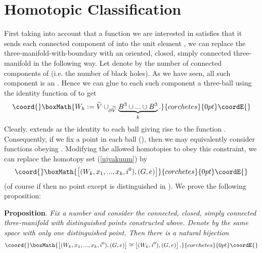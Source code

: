 \documentclass[a4paper,12pt,draft]{article}
\begin{document}
\section{Homotopic Classification}
First taking into account that a function
\coordHE{} we are interested in satisfies
that it sends each connected component of \coordHE{} into the
unit element \coordHE{}, we can replace the 
three-manifold-with-boundary \coordHE{} with an oriented, closed,
simply connected three-manifold \coordHE{} in the following way.
Let denote by \coordHE{} the number of connected components of
\coordHE{} (i.e. the number of black holes). As we have seen,
all such component is an \coordHE{}. Hence we can glue to each such component a
three-ball \coordHE{} using the identity function of \coordHE{} to get 
\[\coord{}\boxMath{W_k:=\widetilde{V}\cup_{\partial\widetilde{V}}\underbrace{B^3
\cup ...\cup B^3}_k.}{corchetes}{0pt}\coordE{}\]
Clearly, \coordHE{} extends as the identity to each ball giving rise to
the function \coordHE{}.
Consequently, if we fix a point \coordHE{} in each ball (\coordHE{}), then we
may equivalently consider functions obeying 
\coordHE{}. Modifying the
allowed homotopies to obey this constraint, we can replace the homotopy
set (\ref{ujvakuum}) by
\[\coord{}\boxMath{\left[ (W_k, x_1,...,x_k, i^0), (G,e)\right]}{corchetes}{0pt}\coordE{}\]
(of course if \coordHE{} then no point except \coordHE{} is distinguished in
\coordHE{}). We prove the following proposition:
\vspace{0.1in}

{\bf Proposition}. {\it Fix a number \coordHE{} and consider the
connected, closed, simply connected three-manifold with \coordHE{} distinguished 
points \coordHE{} constructed above. Denote by
\coordHE{} the same space with only one distinguished point.
Then there is a natural bijection}
\[\coord{}\boxMath{\left[ (W_k, x_1,...,x_k, i^0), (G,e)\right]\cong\left[ (W_k, i^0),
(G,e)\right] .}{corchetes}{0pt}\coordE{}\]
\end{document}
